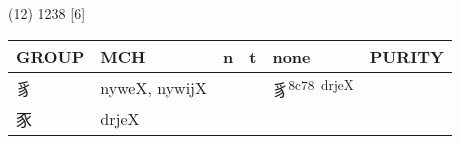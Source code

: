 \documentclass[14pt,a4paper]{scrartcl}
\begin{document}
(12) 1238 {[}6{]}

\begin{longtable}[c]{@{}llllll@{}}
\toprule
\begin{minipage}[b]{0.14\columnwidth}\raggedright\strut
GROUP
\strut\end{minipage} &
\begin{minipage}[b]{0.14\columnwidth}\raggedright\strut
MCH
\strut\end{minipage} &
\begin{minipage}[b]{0.14\columnwidth}\raggedright\strut
n
\strut\end{minipage} &
\begin{minipage}[b]{0.14\columnwidth}\raggedright\strut
t
\strut\end{minipage} &
\begin{minipage}[b]{0.14\columnwidth}\raggedright\strut
none
\strut\end{minipage} &
\begin{minipage}[b]{0.14\columnwidth}\raggedright\strut
PURITY
\strut\end{minipage}\tabularnewline
\midrule
\endhead
\begin{minipage}[t]{0.14\columnwidth}\raggedright\strut
豸
\strut\end{minipage} &
\begin{minipage}[t]{0.14\columnwidth}\raggedright\strut
nyweX, nywijX
\strut\end{minipage} &
\begin{minipage}[t]{0.14\columnwidth}\raggedright\strut
\strut\end{minipage} &
\begin{minipage}[t]{0.14\columnwidth}\raggedright\strut
\strut\end{minipage} &
\begin{minipage}[t]{0.14\columnwidth}\raggedright\strut
豸\textsuperscript{8c78~drjeX}
\strut\end{minipage} &
\begin{minipage}[t]{0.14\columnwidth}\raggedright\strut
\strut\end{minipage}\tabularnewline
\begin{minipage}[t]{0.14\columnwidth}\raggedright\strut
豕
\strut\end{minipage} &
\begin{minipage}[t]{0.14\columnwidth}\raggedright\strut
drjeX
\strut\end{minipage} &
\begin{minipage}[t]{0.14\columnwidth}\raggedright\strut
\strut\end{minipage} &

\end{longtable}
\end{document}
